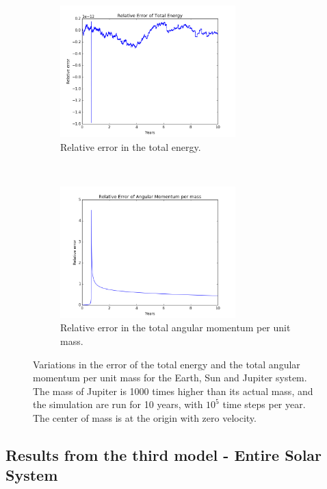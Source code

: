 \documentclass[a4paper, 10pt]{article}
\begin{document}
\begin{figure}[!ht]
    \centering
    \begin{subfigure}[H!]{0.5\textwidth}
        \centering
        \includegraphics[height=2.0in]{relErrEnSEJ.png}
        \caption{Relative error in the total energy.}
    \end{subfigure}%
    ~ 
    \begin{subfigure}[H!]{0.5\textwidth}
        \centering
        \includegraphics[height=2.0in]{relErrMomSEJ.png}
        \caption{Relative error in the total angular momentum per unit mass.}
    \end{subfigure}
    \caption{Variations in the error of the total energy and the total angular momentum per unit mass for the Earth, Sun and Jupiter system. The mass of Jupiter is 1000 times higher than its actual mass, and the simulation are run for 10 years, with $10^5$ time steps per year. The center of mass is at the origin with zero velocity.}\label{fig:Energy_jupiter_1000}
\end{figure}
\newpage

\subsection{Results from the third model - Entire Solar System}
\end{document}
